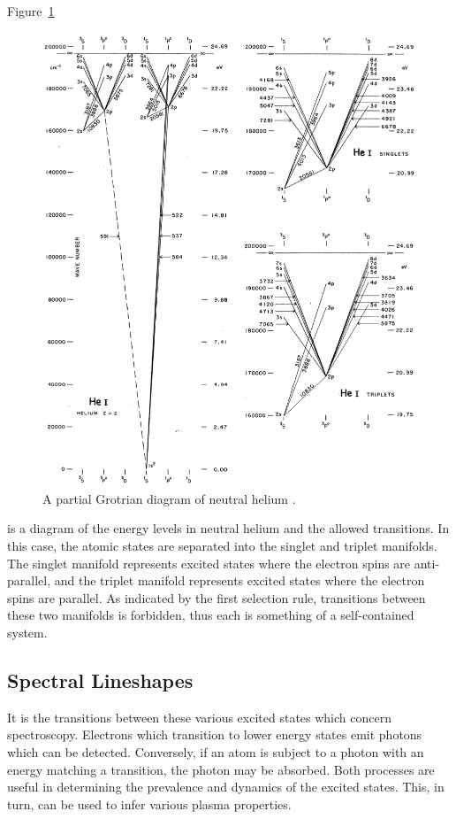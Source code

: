 Figure~\ref{fig:grotrian}
\begin{figure}
  \centering
  \includegraphics{./chapters/theory/figures/grotrian.pdf}
  \caption{A partial Grotrian diagram of neutral helium \cite{Moore1968}.}
  \label{fig:grotrian}
\end{figure}
is a diagram of the energy levels in neutral helium and the allowed transitions.
In this case, the atomic states are separated into the singlet and triplet
manifolds. The singlet manifold represents excited states where the electron
spins are anti-parallel, and the triplet manifold represents excited states
where the electron spins are parallel. As indicated by the first selection rule,
transitions between these two manifolds is forbidden, thus each is something of
a self-contained system.

\subsection{Spectral Lineshapes}

It is the transitions between these various excited states which concern
spectroscopy. Electrons which transition to lower energy states emit photons
which can be detected. Conversely, if an atom is subject to a photon with an
energy matching a transition, the photon may be absorbed. Both processes are
useful in determining the prevalence and dynamics of the excited states. This,
in turn, can be used to infer various plasma properties.

